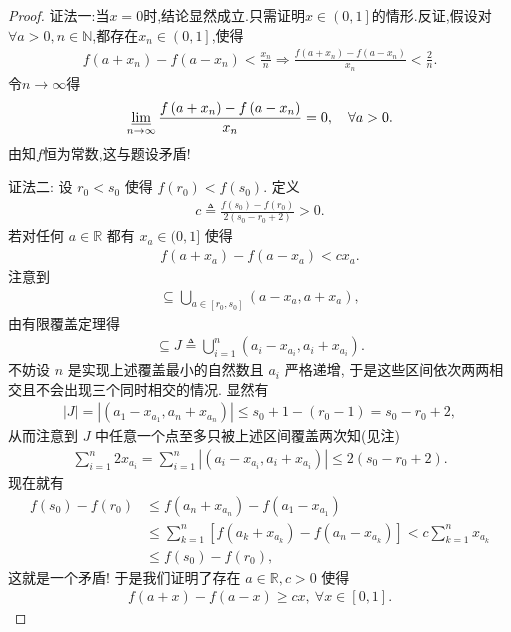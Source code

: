 \documentclass[../../main.tex]{subfiles}%
\begin{document}
\begin{proof}

{\color{blue}证法一:}当$x=0$时,结论显然成立.只需证明$x\in \left( 0,1 \right]$的情形.反证,假设对$\forall a>0,n\in \mathbb{N}$,都存在$x_n\in \left( 0,1 \right]$,使得
\begin{align*}
f\left( a+x_n \right) -f\left( a-x_n \right) <\frac{x_n}{n}\Longrightarrow \frac{f\left( a+x_n \right) -f\left( a-x_n \right)}{x_n}<\frac{2}{n}.
\end{align*}
令$n\rightarrow \infty$得
\begin{align*}
\varliminf\limits_{n\rightarrow \infty}\frac{f\left( a+x_n \right) -f\left( a-x_n \right)}{x_n}=0,\quad \forall a>0.
\end{align*}
由知$f$恒为常数,这与题设矛盾!

{\color{blue}证法二:}
设 $r_0 < s_0$ 使得 $f(r_0) < f(s_0)$. 定义
\begin{align*}
c \triangleq \frac{f(s_0) - f(r_0)}{2(s_0 - r_0 + 2)} > 0.
\end{align*}
若对任何 $a \in \mathbb{R}$ 都有 $x_a \in (0,1]$ 使得
\begin{align*}
f(a + x_a) - f(a - x_a) < c x_a.
\end{align*}
注意到
\begin{align*}
[r_0, s_0] \subseteq \bigcup_{a \in [r_0, s_0]} (a - x_a, a + x_a),
\end{align*}
由有限覆盖定理得
\begin{align*}
[r_0, s_0] \subseteq J \triangleq \bigcup_{i=1}^n (a_i - x_{a_i}, a_i + x_{a_i}).
\end{align*}
不妨设 $n$ 是实现上述覆盖最小的自然数且 $a_i$ 严格递增, 于是这些区间依次两两相交且不会出现三个同时相交的情况. 显然有
\begin{align*}
|J| = |(a_1 - x_{a_1}, a_n + x_{a_n})| \leqslant s_0 + 1 - (r_0 - 1) = s_0 - r_0 + 2,
\end{align*}
从而注意到 $J$ 中任意一个点至多只被上述区间覆盖两次知(见注)
\begin{align*}
\sum_{i=1}^n 2x_{a_i} = \sum_{i=1}^n |(a_i - x_{a_i}, a_i + x_{a_i})| \leqslant 2(s_0 - r_0 + 2).
\end{align*}
现在就有
\begin{align*}
f(s_0) - f(r_0) &\leqslant f(a_n + x_{a_n}) - f(a_1 - x_{a_1}) \\
&\leqslant \sum_{k=1}^n \left[f(a_k + x_{a_k}) - f(a_n - x_{a_k})\right] < c \sum_{k=1}^n x_{a_k} \\
&\leqslant f(s_0) - f(r_0),
\end{align*}
这就是一个矛盾! 于是我们证明了存在 $a \in \mathbb{R}, c > 0$ 使得
\begin{align*}
f(a + x) - f(a - x) \geqslant c x, \ \forall x \in [0, 1].
\end{align*}

\end{proof}
\end{document}
